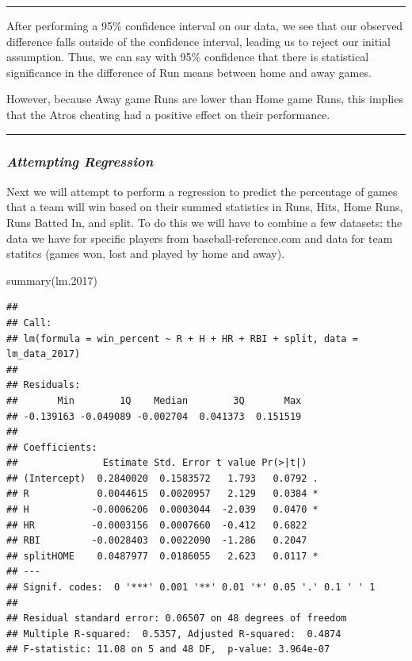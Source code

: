 \documentclass[
]{article}
\newenvironment{Shaded}{\begin{snugshade}}{\end{snugshade}}
\newcommand{\FloatTok}[1]{\textcolor[rgb]{0.00,0.00,0.81}{#1}}
\newcommand{\FunctionTok}[1]{\textcolor[rgb]{0.00,0.00,0.00}{#1}}
\newcommand{\NormalTok}[1]{#1}
\begin{document}
\begin{center}\rule{0.5\linewidth}{0.5pt}\end{center}

After performing a 95\% confidence interval on our data, we see that our
observed difference falls outside of the confidence interval, leading us
to reject our initial assumption. Thus, we can say with 95\% confidence
that there is statistical significance in the difference of Run means
between home and away games.

However, because Away game Runs are lower than Home game Runs, this
implies that the Atros cheating had a positive effect on their
performance.

\begin{center}\rule{0.5\linewidth}{0.5pt}\end{center}

\hypertarget{attempting-regression}{%
\subsubsection{\texorpdfstring{\emph{Attempting
Regression}}{Attempting Regression}}\label{attempting-regression}}

Next we will attempt to perform a regression to predict the percentage
of games that a team will win based on their summed statistics in Runs,
Hits, Home Runs, Runs Batted In, and split. To do this we will have to
combine a few datasets: the data we have for specific players from
baseball-reference.com and data for team statitcs (games won, lost and
played by home and away).

\begin{Shaded}
\begin{Highlighting}[]
\FunctionTok{summary}\NormalTok{(lm}\FloatTok{.2017}\NormalTok{)}
\end{Highlighting}
\end{Shaded}

\begin{verbatim}
## 
## Call:
## lm(formula = win_percent ~ R + H + HR + RBI + split, data = lm_data_2017)
## 
## Residuals:
##       Min        1Q    Median        3Q       Max 
## -0.139163 -0.049089 -0.002704  0.041373  0.151519 
## 
## Coefficients:
##               Estimate Std. Error t value Pr(>|t|)  
## (Intercept)  0.2840020  0.1583572   1.793   0.0792 .
## R            0.0044615  0.0020957   2.129   0.0384 *
## H           -0.0006206  0.0003044  -2.039   0.0470 *
## HR          -0.0003156  0.0007660  -0.412   0.6822  
## RBI         -0.0028403  0.0022090  -1.286   0.2047  
## splitHOME    0.0487977  0.0186055   2.623   0.0117 *
## ---
## Signif. codes:  0 '***' 0.001 '**' 0.01 '*' 0.05 '.' 0.1 ' ' 1
## 
## Residual standard error: 0.06507 on 48 degrees of freedom
## Multiple R-squared:  0.5357, Adjusted R-squared:  0.4874 
## F-statistic: 11.08 on 5 and 48 DF,  p-value: 3.964e-07
\end{verbatim}
\end{document}
